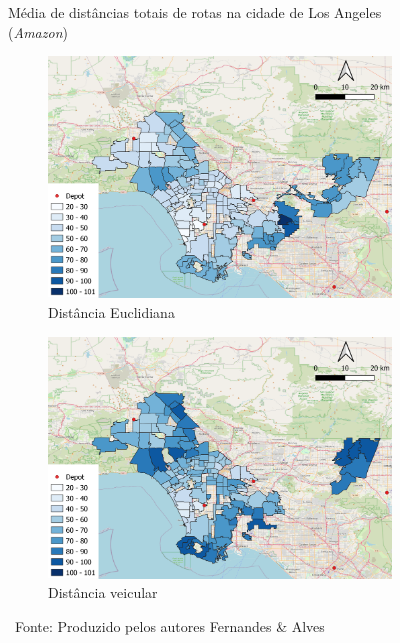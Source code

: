 \begin{figure}[H]
    \centering
    \caption{Média de distâncias totais de rotas na cidade de Los Angeles (\textit{Amazon})} \label{fig:distanciasRotasLA}
    \begin{subfigure}{0.45\textwidth}
        \caption{Distância Euclidiana}
        \includegraphics[width=\textwidth]{images/6_amazon/distancias/Avg Sum of Euc. Dist. Route - LA.png}
    \end{subfigure}
    \begin{subfigure}{0.45\textwidth}
        \caption{Distância veicular}
        \includegraphics[width=\textwidth]{images/6_amazon/distancias/Avg Sum of Driving Dist. Route - LA.png}
    \end{subfigure}
    \caption*{\ Fonte: Produzido pelos autores Fernandes \& Alves}
\end{figure}

